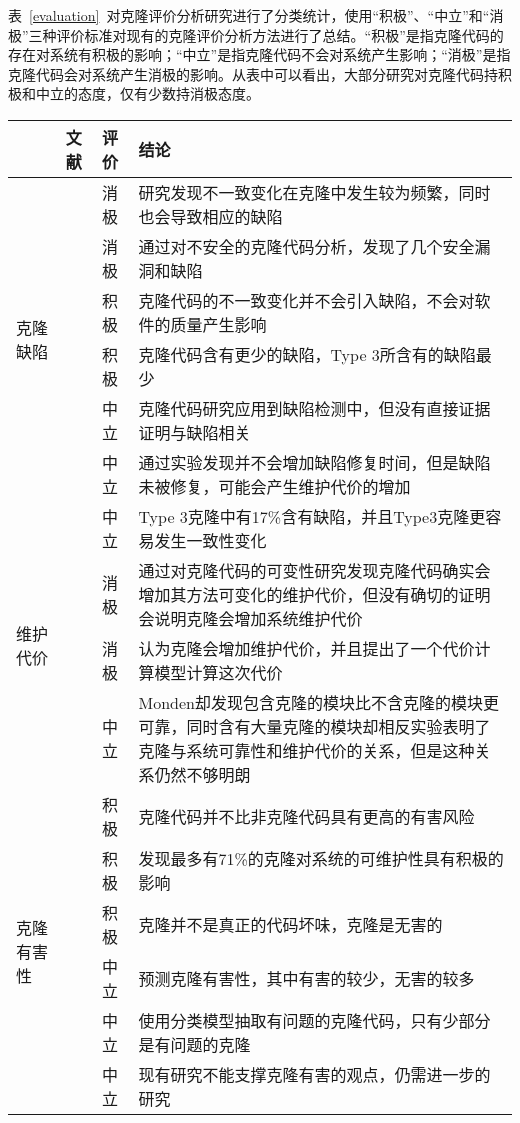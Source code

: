 表~\ref{evaluation}~对克隆评价分析研究进行了分类统计，使用“积极”、“中立”和“消极”三种评价标准对现有的克隆评价分析方法进行了总结。“积极”是指克隆代码的存在对系统有积极的影响；“中立”是指克隆代码不会对系统产生影响；“消极”是指克隆代码会对系统产生消极的影响。从表中可以看出，大部分研究对克隆代码持积极和中立的态度，仅有少数持消极态度。

\begin{table}[htbp]
\centering
{}\vspace{0.5em}\wuhao
\begin{tabularx}{0.9\textwidth}{lllX}
\toprule[1.5pt]
&文献&评价&结论\\
\midrule[1pt]
\multirow{6}{*}{{克隆缺陷}} 
&\cite{juergens2009code}&消极&研究发现不一致变化在克隆中发生较为频繁，同时也会导致相应的缺陷\\
&\cite{gauthier2013uncovering}&消极&通过对不安全的克隆代码分析，发现了几个安全漏洞和缺陷\\
&\cite{bettenburg2009empirical}&积极&克隆代码的不一致变化并不会引入缺陷，不会对软件的质量产生影响\\
&\cite{elish2015fault}&积极&克隆代码含有更少的缺陷，Type 3所含有的缺陷最少\\
&\cite{lo2012active}&中立&克隆代码研究应用到缺陷检测中，但没有直接证据证明与缺陷相关\\
&\cite{kamei2011empirical}&中立	&通过实验发现并不会增加缺陷修复时间，但是缺陷未被修复，可能会产生维护代价的增加\\
\midrule[1pt]
\multirow{4}{*}{{维护代价}} 
&\cite{wagner2016relationship}&中立	&Type 3克隆中有17\%含有缺陷，并且Type3克隆更容易发生一致性变化\\
&\cite{harder2012controlled}&消极&通过对克隆代码的可变性研究发现克隆代码确实会增加其方法可变化的维护代价，但没有确切的证明会说明克隆会增加系统维护代价\\
&\cite{juergens2010much}&消极&认为克隆会增加维护代价，并且提出了一个代价计算模型计算这次代价\\
&\cite{monden2002software}&中立&Monden却发现包含克隆的模块比不含克隆的模块更可靠，同时含有大量克隆的模块却相反实验表明了克隆与系统可靠性和维护代价的关系，但是这种关系仍然不够明朗\\
\midrule[1pt]
\multirow{6}{*}{{克隆有害性}} 
&\cite{selim2010studying}&积极&克隆代码并不比非克隆代码具有更高的有害风险\\
&\cite{kapser2006cloning}\cite{kapser2008cloning}&积极	&发现最多有71\%的克隆对系统的可维护性具有积极的影响\\
&\cite{rahman2012clones}&积极	&克隆并不是真正的代码坏味，克隆是无害的\\
&\cite{wang2012can}&中立	&预测克隆有害性，其中有害的较少，无害的较多\\
&\cite{higo2009problematic}&中立&使用分类模型抽取有问题的克隆代码，只有少部分是有问题的克隆\\
&\cite{hordijk2009harmfulness}&中立&现有研究不能支撑克隆有害的观点，仍需进一步的研究\\
\bottomrule[1.5pt]
\end{tabularx}
\end{table}

